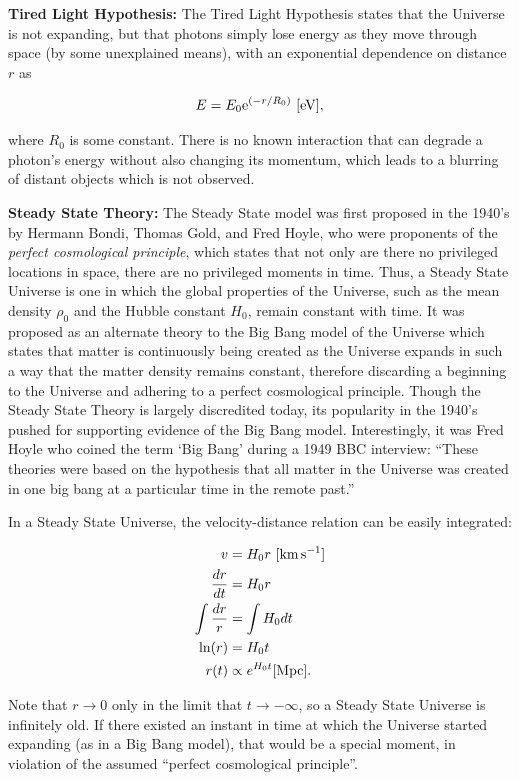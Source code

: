 \documentclass[a4paper,11pt]{article}
\begin{document}
{\noindent}\textbf{Tired Light Hypothesis:} The Tired Light Hypothesis states that the Universe is not expanding, but that photons simply lose energy as they move through space (by some unexplained means), with an exponential dependence on distance $r$ as

\begin{align*}
    E = E_0 \mathrm{e}^{(-r/R_0)} ~ [{\rm eV}],
\end{align*}

{\noindent}where $R_0$ is some constant. There is no known interaction that can degrade a photon's energy without also changing its momentum, which leads to a blurring of distant objects which is not observed.

{\noindent}\textbf{Steady State Theory:} The Steady State model was first proposed in the 1940's by Hermann Bondi, Thomas Gold, and Fred Hoyle, who were proponents of the \textit{perfect cosmological principle}, which states that not only are there no privileged locations in space, there are no privileged moments in time. Thus, a Steady State Universe is one in which the global properties of the Universe, such as the mean density $\rho_0$ and the Hubble constant $H_0$, remain constant with time. It was proposed as an alternate theory to the Big Bang model of the Universe which states that matter is continuously being created as the Universe expands in such a way that the matter density remains constant, therefore discarding a beginning to the Universe and adhering to a perfect cosmological principle. Though the Steady State Theory is largely discredited today, its popularity in the 1940's pushed for supporting evidence of the Big Bang model. Interestingly, it was Fred Hoyle who coined the term `Big Bang' during a 1949 BBC interview: ``These theories were based on the hypothesis that all matter in the Universe was created in one big bang at a particular time in the remote past.''

{\noindent}In a Steady State Universe, the velocity-distance relation can be easily integrated:

\begin{align*}
    v &= H_0r ~ [{\rm km\,s^{-1}}]\\
    \frac{dr}{dt} &= H_0r \\
    \int \frac{dr}{r} &= \int H_0 dt \\
    \ln (r) &= H_0t \\
    r(t) &\propto e^{H_0t} [{\rm Mpc}].
\end{align*}

{\noindent}Note that $r \rightarrow 0$ only in the limit that $t \rightarrow -\infty$, so a Steady State Universe is infinitely old. If there existed an instant in time at which the Universe started expanding (as in a Big Bang model), that would be a special moment, in violation of the assumed ``perfect cosmological principle''. 
\end{document}
